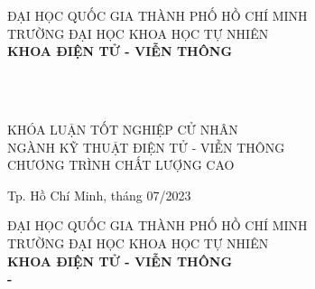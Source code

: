 \hypersetup{pageanchor=false}
\begin{titlepage}

\begin{center}
ĐẠI HỌC QUỐC GIA THÀNH PHỐ HỒ CHÍ MINH\\
TRƯỜNG ĐẠI HỌC KHOA HỌC TỰ NHIÊN\\
\textbf{KHOA ĐIỆN TỬ - VIỄN THÔNG}\\[2cm]


{ \Large \bfseries \tenSV \\[2cm] } 


{ \Large \bfseries \tenKL \\[3cm]} 


\large KHÓA LUẬN TỐT NGHIỆP CỬ NHÂN\\
\large NGÀNH KỸ THUẬT ĐIỆN TỬ - VIỄN THÔNG\\
\large CHƯƠNG TRÌNH CHẤT LƯỢNG CAO\\



\vfill
Tp. Hồ Chí Minh, tháng 07/2023

\end{center}

\pagebreak



\begin{center}
ĐẠI HỌC QUỐC GIA THÀNH PHỐ HỒ CHÍ MINH\\
TRƯỜNG ĐẠI HỌC KHOA HỌC TỰ NHIÊN\\
\textbf{KHOA ĐIỆN TỬ - VIỄN THÔNG}\\[2cm]


{\large \bfseries \tenSV\space - \mssv \\[2cm]}



\end{center}
\end{titlepage}
